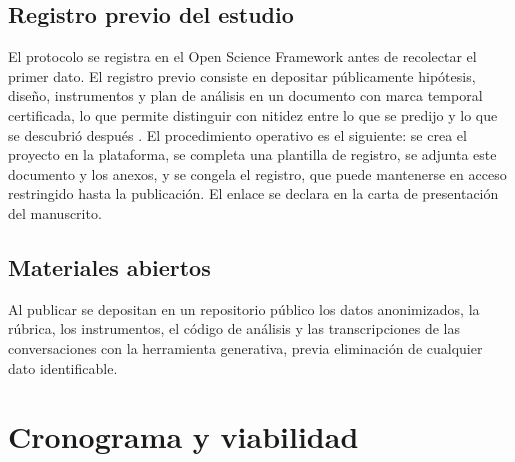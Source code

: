 \documentclass[12pt,a4paper,openany]{report}
\begin{document}
    \section{Registro previo del estudio}
    
    El protocolo se registra en el Open Science Framework antes de recolectar el primer dato. El registro previo consiste en depositar p\'ublicamente hip\'otesis, dise\~no, instrumentos y plan de an\'alisis en un documento con marca temporal certificada, lo que permite distinguir con nitidez entre lo que se predijo y lo que se descubri\'o despu\'es \citep{nosek2018preregistration}. El procedimiento operativo es el siguiente: se crea el proyecto en la plataforma, se completa una plantilla de registro, se adjunta este documento y los anexos, y se congela el registro, que puede mantenerse en acceso restringido hasta la publicaci\'on. El enlace se declara en la carta de presentaci\'on del manuscrito.
    
    \section{Materiales abiertos}
    
    Al publicar se depositan en un repositorio p\'ublico los datos anonimizados, la r\'ubrica, los instrumentos, el c\'odigo de an\'alisis y las transcripciones de las conversaciones con la herramienta generativa, previa eliminaci\'on de cualquier dato identificable.
    
    \chapter{Cronograma y viabilidad}
    
\end{document}
